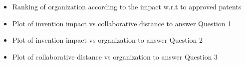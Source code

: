 	\begin{itemize}
	\squish
		\item Ranking of organization according to the impact w.r.t to approved patents
		\item Plot of invention impact vs collaborative distance to answer Question 1
		\item Plot of invention impact vs organization to answer Question 2
		\item Plot of collaborative distance vs organization to answer Question 3
	\end{itemize}